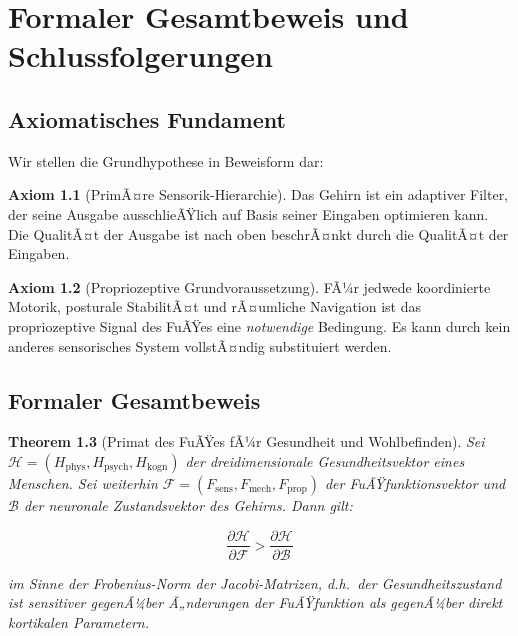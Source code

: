 ﻿\documentclass[12pt,a4paper]{report}
\theoremstyle{plain}
\newtheorem{theorem}{Theorem}[section]
\theoremstyle{definition}
\newtheorem{axiom}[theorem]{Axiom}
\theoremstyle{remark}
\begin{document}
\chapter{Formaler Gesamtbeweis und Schlussfolgerungen}

\section{Axiomatisches Fundament}

Wir stellen die Grundhypothese in Beweisform dar:

\begin{axiom}[PrimÃ¤re Sensorik-Hierarchie]
Das Gehirn ist ein adaptiver Filter, der seine Ausgabe ausschlieÃŸlich
auf Basis seiner Eingaben optimieren kann. Die QualitÃ¤t der Ausgabe
ist nach oben beschrÃ¤nkt durch die QualitÃ¤t der Eingaben.
\end{axiom}

\begin{axiom}[Propriozeptive Grundvoraussetzung]
FÃ¼r jedwede koordinierte Motorik, posturale StabilitÃ¤t und rÃ¤umliche
Navigation ist das propriozeptive Signal des FuÃŸes eine
\emph{notwendige} Bedingung. Es kann durch kein anderes sensorisches
System vollstÃ¤ndig substituiert werden.
\end{axiom}

\section{Formaler Gesamtbeweis}\label{sec:formaler_beweis}

\begin{theorem}[Primat des FuÃŸes fÃ¼r Gesundheit und Wohlbefinden]
Sei $\mathcal{H} = (H_{\text{phys}}, H_{\text{psych}}, H_{\text{kogn}})$
der dreidimensionale Gesundheitsvektor eines Menschen. Sei weiterhin
$\mathcal{F} = (F_{\text{sens}}, F_{\text{mech}}, F_{\text{prop}})$
der FuÃŸfunktionsvektor und $\mathcal{B}$ der neuronale Zustandsvektor
des Gehirns. Dann gilt:

\[
  \frac{\partial \mathcal{H}}{\partial \mathcal{F}} > \frac{\partial \mathcal{H}}{\partial \mathcal{B}}
\]

im Sinne der Frobenius-Norm der Jacobi-Matrizen, d.h.\ der Gesundheitszustand
ist sensitiver gegenÃ¼ber Ã„nderungen der FuÃŸfunktion als gegenÃ¼ber
direkt kortikalen Parametern.
\end{theorem}
\end{document}
